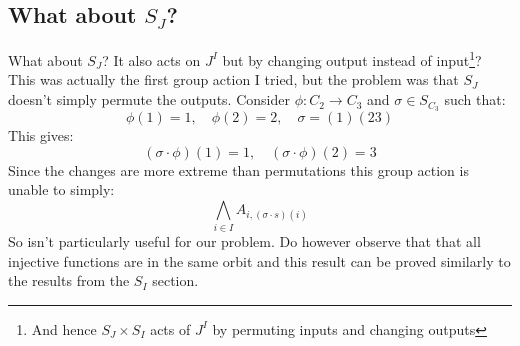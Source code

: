 \subsection{What about $S_J$?}
What about $S_J$?
It also acts on $J^I$ but by changing output instead of input\footnote{
And hence $S_J\times S_I$ acts of $J^I$ by permuting inputs and changing outputs}?
This was actually the first group action I tried,
but the problem was that $S_J$ doesn't simply permute the outputs.
Consider $\phi: C_2\rightarrow C_3$ and $\sigma\in S_{C_3}$ such that:
\[\phi(1) = 1,\quad \phi(2) = 2,\quad \sigma = (1)(23)\]
This gives:
\[(\sigma\cdot\phi)(1) =1,\quad(\sigma\cdot\phi)(2)=3\]
Since the changes are more extreme than permutations this group action is unable to simply:
\[\bigwedge_{i\in I}A_{i,(\sigma\cdot s)(i)}\]
So isn't particularly useful for our problem.
Do however observe that that all injective functions are in the same orbit and this result can be proved similarly to the results from the $S_I$ section.
